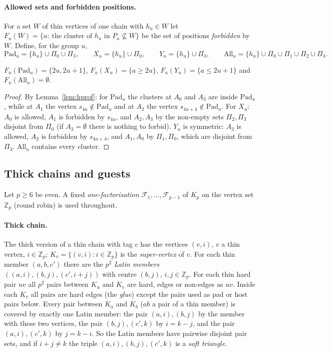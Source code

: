 \paragraph{Allowed sets and forbidden positions.} For a set $W$ of thin vertices of one chain with $h_u\in W$ let $F_u(W)=\{a:\ \text{the cluster of }h_u\text{ in }P_a\not\subseteq W\}$ be the set of positions \emph{forbidden} by $W$. Define, for the group $u$,
\[
\mathrm{Pad}_u=\{h_u\}\cup\Pi_0\cup\Pi_3,\qquad X_u=\{h_u\}\cup\Pi_0,\qquad Y_u=\{h_u\}\cup\Pi_3,\qquad \mathrm{All}_u=\{h_u\}\cup\Pi_0\cup\Pi_1\cup\Pi_2\cup\Pi_3 .
\]
\begin{corollary}\label{cor:hforb}
$F_u(\mathrm{Pad}_u)=\{2u,2u+1\}$, $F_u(X_u)=\{a\ge2u\}$, $F_u(Y_u)=\{a\le2u+1\}$ and $F_u(\mathrm{All}_u)=\emptyset$.
\end{corollary}
\begin{proof}
By Lemma~\ref{lem:hprof}: for $\mathrm{Pad}_u$ the clusters at $A_0$ and $A_3$ are inside $\mathrm{Pad}_u$, while at $A_1$ the vertex $s_{4u}\notin\mathrm{Pad}_u$ and at $A_2$ the vertex $s_{4u+4}\notin\mathrm{Pad}_u$. For $X_u$: $A_0$ is allowed, $A_1$ is forbidden by $s_{4u}$, and $A_2,A_3$ by the non-empty sets $\Pi_2,\Pi_3$ disjoint from $\Pi_0$ (if $A_3=\emptyset$ there is nothing to forbid). $Y_u$ is symmetric: $A_3$ is allowed, $A_2$ is forbidden by $s_{4u+4}$, and $A_1,A_0$ by $\Pi_1,\Pi_0$, which are disjoint from $\Pi_3$. $\mathrm{All}_u$ contains every cluster.
\end{proof}

\subsection{Thick chains and guests}\label{sec:hthick}
Let $p\ge6$ be even. A fixed \emph{one-factorisation} $\mathcal F_1,\dots,\mathcal F_{p-1}$ of $K_p$ on the vertex set $\mathbb Z_p$ (round robin) is used throughout.

\paragraph{Thick chain.} The thick version of a thin chain with tag $c$ has the vertices $(v,i)$, $v$ a thin vertex, $i\in\mathbb Z_p$; $K_v=\{(v,i):i\in\mathbb Z_p\}$ is the \emph{super-vertex} of $v$. For each thin member $(a,b,c')$ there are the $p^2$ \emph{Latin members} $((a,i),(b,j),(c',i+j))$ with centre $(b,j)$, $i,j\in\mathbb Z_p$. For each thin hard pair $uv$ all $p^2$ pairs between $K_u$ and $K_v$ are hard, edges or non-edges as $uv$. Inside each $K_v$ all pairs are hard edges (the \emph{glue}) except the pairs used as pad or host pairs below. Every pair between $K_a$ and $K_b$ ($ab$ a pair of a thin member) is covered by exactly one Latin member: the pair $(a,i),(b,j)$ by the member with these two vertices, the pair $(b,j),(c',k)$ by $i=k-j$, and the pair $(a,i),(c',k)$ by $j=k-i$. So the Latin members have pairwise disjoint pair sets, and if $i+j\ne k$ the triple $(a,i),(b,j),(c',k)$ is a \emph{soft triangle}.

